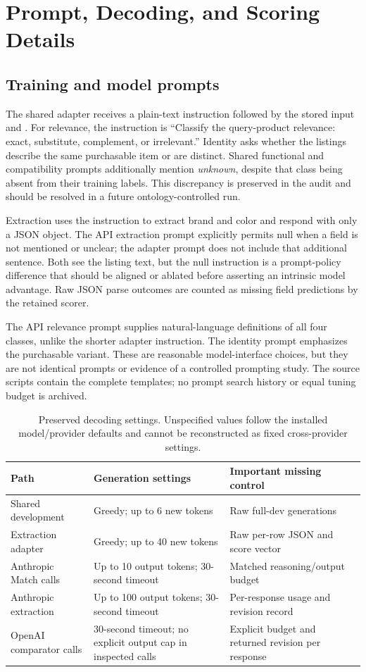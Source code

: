 \section{Prompt, Decoding, and Scoring Details}
\label{app:protocol}
\subsection{Training and model prompts}
The shared adapter receives a plain-text instruction followed by the stored input and . For relevance, the instruction is ``Classify the query-product relevance: exact, substitute, complement, or irrelevant.'' Identity asks whether the listings describe the same purchasable item or are distinct. Shared functional and compatibility prompts additionally mention \emph{unknown}, despite that class being absent from their training labels. This discrepancy is preserved in the audit and should be resolved in a future ontology-controlled run.

Extraction uses the instruction to extract brand and color and respond with only a JSON object. The API extraction prompt explicitly permits null when a field is not mentioned or unclear; the adapter prompt does not include that additional sentence. Both see the listing text, but the null instruction is a prompt-policy difference that should be aligned or ablated before asserting an intrinsic model advantage. Raw JSON parse outcomes are counted as missing field predictions by the retained scorer.

The API relevance prompt supplies natural-language definitions of all four classes, unlike the shorter adapter instruction. The identity prompt emphasizes the purchasable variant. These are reasonable model-interface choices, but they are not identical prompts or evidence of a controlled prompting study. The source scripts contain the complete templates; no prompt search history or equal tuning budget is archived.

\begin{table}[h]
\centering\small
\caption{Preserved decoding settings. Unspecified values follow the installed model/provider defaults and cannot be reconstructed as fixed cross-provider settings.}
\begin{tabularx}{\textwidth}{P{3.3cm}YY}
\toprule
Path & Generation settings & Important missing control \\
\midrule
Shared development & Greedy; up to 6 new tokens & Raw full-dev generations \\
Extraction adapter & Greedy; up to 40 new tokens & Raw per-row JSON and score vector \\
Anthropic Match calls & Up to 10 output tokens; 30-second timeout & Matched reasoning/output budget \\
Anthropic extraction & Up to 100 output tokens; 30-second timeout & Per-response usage and revision record \\
OpenAI comparator calls & 30-second timeout; no explicit output cap in inspected calls & Explicit budget and returned revision per response \\
\bottomrule
\end{tabularx}
\end{table}

